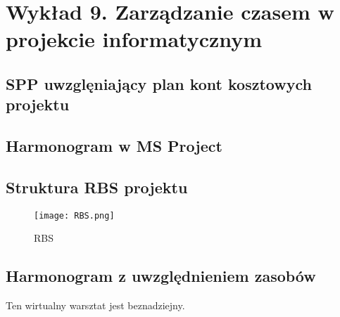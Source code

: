 \chapter{Wykład 9. Zarządzanie czasem w projekcie informatycznym}

\section{SPP uwzglęniający plan kont kosztowych projektu}




\section{Harmonogram w MS Project}




\section{Struktura RBS projektu}

\begin{figure}[htb]
\begin{center}
\texttt{[image: RBS.png]}
\caption[RBS]{RBS}
\label{rysunekProces}
\end{center}
\end{figure}


\section{Harmonogram z uwzględnieniem zasobów}

Ten wirtualny warsztat jest beznadziejny.


